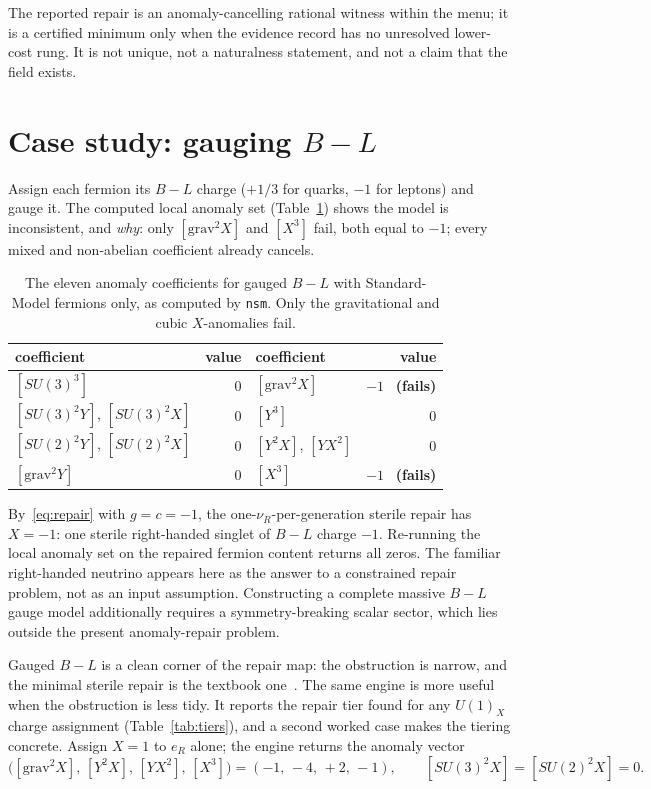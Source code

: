 \documentclass[11pt]{article}
\newcommand{\nsm}{\texttt{nsm}}
\newcommand{\UX}{U(1)_X}
\newcommand{\SUthree}{SU(3)}
\newcommand{\SUtwo}{SU(2)}
\begin{document}
The reported repair is an anomaly-cancelling rational witness within the menu;
it is a certified minimum only when the evidence record has no unresolved
lower-cost rung. It is not unique, not a naturalness statement, and not a claim
that the field exists.

\section{\texorpdfstring{Case study: gauging $B\!-\!L$}{Case study: gauging B-L}}
\label{sec:casestudy}

Assign each fermion its $B\!-\!L$ charge ($+1/3$ for quarks, $-1$ for leptons)
and gauge it. The computed local anomaly set (Table~\ref{tab:bml}) shows the model is
inconsistent, and \emph{why}: only $[\text{grav}^2 X]$ and $[X^3]$ fail, both
equal to $-1$; every mixed and non-abelian coefficient already cancels.

\begin{table}[t]
\centering
\small
\begin{tabular}{@{}lrlr@{}}
\toprule
coefficient & value & coefficient & value\\
\midrule
$[\SUthree^3]$ & $0$ & $[\text{grav}^2 X]$ & $-1$ \ \textbf{(fails)}\\
$[\SUthree^2 Y]$, $[\SUthree^2 X]$ & $0$ & $[Y^3]$ & $0$\\
$[\SUtwo^2 Y]$, $[\SUtwo^2 X]$ & $0$ & $[Y^2 X]$, $[Y X^2]$ & $0$\\
$[\text{grav}^2 Y]$ & $0$ & $[X^3]$ & $-1$ \ \textbf{(fails)}\\
\bottomrule
\end{tabular}
\caption{The eleven anomaly coefficients for gauged $B\!-\!L$ with
Standard-Model fermions only, as computed by \nsm. Only the gravitational and
cubic $X$-anomalies fail.}
\label{tab:bml}
\end{table}

By~\eqref{eq:repair} with $g=c=-1$, the one-$\nu_R$-per-generation sterile repair
has $X=-1$: one sterile right-handed singlet of $B\!-\!L$ charge $-1$. Re-running
the local anomaly set on the repaired fermion content returns all zeros. The
familiar right-handed neutrino appears here as the answer to a constrained repair
problem, not as an input assumption.
Constructing a complete massive $B\!-\!L$ gauge model additionally requires a
symmetry-breaking scalar sector, which lies outside the present anomaly-repair
problem.

Gauged $B\!-\!L$ is a clean corner of the repair map: the obstruction is narrow,
and the minimal sterile repair is the textbook one~\cite{bminusL}. The same
engine is more useful when the obstruction is less tidy. It reports the
repair tier found for any $\UX$ charge assignment
(Table~\ref{tab:tiers}), and a second worked case makes the tiering
concrete. Assign $X=1$ to $e_R$ alone; the engine returns the anomaly vector
\[
\bigl([\text{grav}^2X],\,[Y^2X],\,[YX^2],\,[X^3]\bigr) = (-1,\,-4,\,+2,\,-1),
\qquad [\SUthree^2X]=[\SUtwo^2X]=0 .
\]
\end{document}
